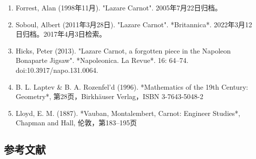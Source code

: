 \begin{enumerate}
\item Forrest, Alan (1998年11月). "Lazare Carnot". 2005年7月22日归档。  
\item Soboul, Albert (2011年3月28日). "Lazare Carnot". *Britannica*. 2022年3月12日归档。2017年4月3日检索。  
\item Hicks, Peter (2013). "Lazare Carnot, a forgotten piece in the Napoleon Bonaparte Jigsaw". *Napoleonica. La Revue*. 16: 64–74. doi:10.3917/napo.131.0064.  
\item B. L. Laptev & B. A. Rozenfel'd (1996). *Mathematics of the 19th Century: Geometry*, 第28页，Birkhäuser Verlag，ISBN 3-7643-5048-2  
\item Lloyd, E. M. (1887). *Vauban, Montalembert, Carnot: Engineer Studies*, Chapman and Hall, 伦敦，第183–195页
\end{enumerate}
\subsection{参考文献}  
